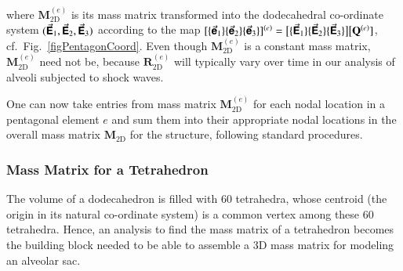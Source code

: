 where $\mathbf{M}^{(e)}_{\mathrm{2D}}$ is its mass matrix transformed into the dodecahedral co-ordinate system $( \vec{\boldsymbol{\mathsf{E}}}_1 , \vec{\boldsymbol{\mathsf{E}}}_2 , \vec{\boldsymbol{\mathsf{E}}}_3 )$ according to the map $[ \{ \vec{\boldsymbol{\mathsf{e}}}_1 \} \{ \vec{\boldsymbol{\mathsf{e}}}_2 \} \{ \vec{\boldsymbol{\mathsf{e}}}_3 \} ]^{(e)} = \bigl[ \{ \vec{\boldsymbol{\mathsf{E}}}_1 \} \{ \vec{\boldsymbol{\mathsf{E}}}_2 \} \{ \vec{\boldsymbol{\mathsf{E}}}_3 \} \bigr] \bigl[ \mathbf{Q}^{(e)} ]$, cf.\ Fig.~\ref{figPentagonCoord}.  Even though $\boldsymbol{M}^{(e)}_{\mathrm{2D}}$ is a constant mass matrix, $\mathbf{M}^{(e)}_{\mathrm{2D}}$ need not be, because $\mathbf{R}^{(e)}_{\mathrm{2D}}$ will typically vary over time in our analysis of alveoli subjected to shock waves.

One can now take entries from mass matrix $\mathbf{M}^{(e)}_{\mathrm{2D}}$ for each nodal location in a pentagonal element $e$ and sum them into their appropriate nodal locations in the overall mass matrix $\mathbf{M}_{\mathrm{2D}}$ for the structure, following standard procedures. \cite{ClaytonChung18}

\subsubsection{Mass Matrix for a Tetrahedron}

The volume of a dodecahedron is filled with 60 tetrahedra, whose centroid (the origin in its natural co-ordinate system) is a common vertex among these 60 tetrahedra. Hence, an analysis to find the mass matrix of a tetrahedron becomes the building block needed to be able to assemble a 3D mass matrix for modeling an alveolar sac.

